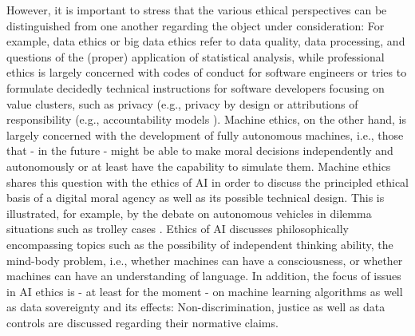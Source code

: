 \documentclass[manuscript,screen]{acmart}
\begin{document}
However, it is important to stress that the various ethical perspectives can be distinguished from one another regarding the object under consideration: For example, data ethics or big data ethics refer to data quality, data processing, and questions of the (proper) application of statistical analysis, while professional ethics is largely concerned with codes of conduct for software engineers or tries to formulate decidedly technical instructions for software developers focusing on value clusters, such as privacy (e.g., privacy by design \citep{schulz2012privacy} or attributions of responsibility (e.g., accountability models \citep{kacianka2021designing}). Machine ethics, on the other hand, is largely concerned with the development of fully autonomous machines, i.e., those that - in the future - might be able to make moral decisions independently and autonomously or at least have the capability to simulate them. Machine ethics shares this question with the ethics of AI in order to discuss the principled ethical basis of a digital moral agency as well as its possible technical design. This is illustrated, for example, by the debate on autonomous vehicles in dilemma situations such as trolley cases \citep{gogoll2017autonomous}\citep{hevelke2015responsibility}. Ethics of AI discusses philosophically encompassing topics such as the possibility of independent thinking ability, the mind-body problem, i.e., whether machines can have a consciousness, or whether machines can have an understanding of language. In addition, the focus of issues in AI ethics is - at least for the moment - on machine learning algorithms as well as data sovereignty and its effects: Non-discrimination, justice as well as data controls are discussed regarding their normative claims.
\end{document}
